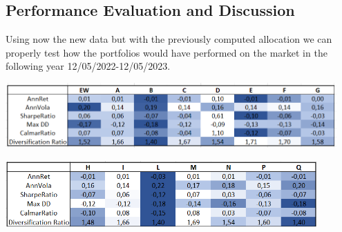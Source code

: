 \documentclass{assignment}
\begin{document}
\subsection*{Performance Evaluation and Discussion}

Using now the new data but with the previously computed allocation we can properly test how the portfolios would have performed on the market in the following year 12/05/2022-12/05/2023.

\begin{center}
    \includegraphics[height=2.5cm]
    {assets/Blue3.png}
\end{center}

\begin{center}
    \includegraphics[height=2.5cm]
    {assets/Blue4.png}
\end{center}
\end{document}
